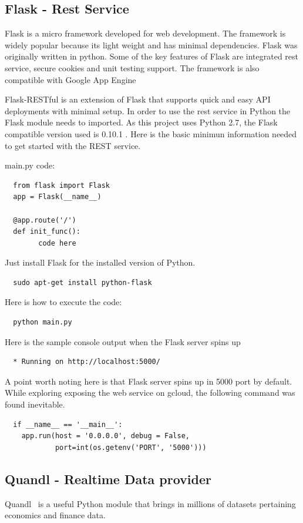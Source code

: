 \subsection{Flask - Rest Service}
Flask is a micro framework developed for web development. The framework is
widely popular because its light weight and has minimal dependencies. Flask
was originally written in python. Some of the key features of Flask are
integrated rest service, secure cookies and unit testing support. The
framework is also compatible with Google App
Engine~\cite{hid-sp18-417-google_appengine}

Flask-RESTful is an extension of Flask that supports quick and easy API
deployments with minimal setup. In order to use the rest service in Python the
Flask module needs to imported. As this project uses Python 2.7, the Flask
compatible version used is 0.10.1 . Here is the basic minimun information
needed to get started with the REST service.

main.py code:

\begin{verbatim}
  from flask import Flask
  app = Flask(__name__)

  @app.route('/')
  def init_func():
        code here
\end{verbatim}

Just install Flask for the installed version of Python.

\begin{verbatim}
  sudo apt-get install python-flask
\end{verbatim}

Here is how to execute the code:
\begin{verbatim}
  python main.py
\end{verbatim}

Here is the sample console output when the Flask server spins up

\begin{verbatim}
  * Running on http://localhost:5000/
\end{verbatim}
A point worth noting here is that Flask server spins up in 5000 port by
default. While exploring exposing the web service on gcloud, the following
command was found inevitable.

\begin{verbatim}
  if __name__ == '__main__':
    app.run(host = '0.0.0.0', debug = False, 
            port=int(os.getenv('PORT', '5000')))
\end{verbatim}

\subsection{Quandl - Realtime Data provider}
Quandl~\cite{hid-sp18-417-Quandl} is a useful Python module that brings in
millions of datasets pertaining economics and finance data. 

